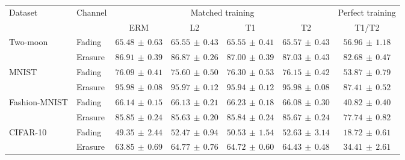 \begin{tabular*}{\linewidth}{@{\extracolsep{\fill}}llccccc@{}}
\toprule
\multirow{2}{*}{Dataset} & \multirow{2}{*}{Channel} & \multicolumn{4}{c}{Matched training} & Perfect training \\
\cmidrule(lr){3-6}\cmidrule(l){7-7}
 & & ERM & L2 & T1 & T2 & T1/T2 \\
\midrule
\multirow{2}{*}{Two-moon} & Fading & $65.48\,\pm\,0.63$ & $65.55\,\pm\,0.43$ & $65.55\,\pm\,0.41$ & $\mathbf{65.57}\,\pm\,0.43$ & $56.96\,\pm\,1.18$ \\
 & Erasure & $86.91\,\pm\,0.39$ & $86.87\,\pm\,0.26$ & $87.00\,\pm\,0.39$ & $\mathbf{87.03}\,\pm\,0.43$ & $82.68\,\pm\,0.47$ \\
\midrule[0.25pt]
\multirow{2}{*}{MNIST} & Fading & $76.09\,\pm\,0.41$ & $75.60\,\pm\,0.50$ & $\mathbf{76.30}\,\pm\,0.53$ & $76.15\,\pm\,0.42$ & $53.87\,\pm\,0.79$ \\
 & Erasure & $95.98\,\pm\,0.08$ & $95.97\,\pm\,0.12$ & $95.94\,\pm\,0.12$ & $\mathbf{95.98}\,\pm\,0.08$ & $87.41\,\pm\,0.52$ \\
\midrule[0.25pt]
\multirow{2}{*}{Fashion-MNIST} & Fading & $66.14\,\pm\,0.15$ & $66.13\,\pm\,0.21$ & $\mathbf{66.23}\,\pm\,0.18$ & $66.08\,\pm\,0.30$ & $40.82\,\pm\,0.40$ \\
 & Erasure & $\mathbf{85.85}\,\pm\,0.24$ & $85.63\,\pm\,0.20$ & $85.84\,\pm\,0.24$ & $85.67\,\pm\,0.24$ & $77.74\,\pm\,0.82$ \\
\midrule[0.25pt]
\multirow{2}{*}{CIFAR-10} & Fading & $49.35\,\pm\,2.44$ & $52.47\,\pm\,0.94$ & $50.53\,\pm\,1.54$ & $\mathbf{52.63}\,\pm\,3.14$ & $18.72\,\pm\,0.61$ \\
 & Erasure & $63.85\,\pm\,0.69$ & $\mathbf{64.77}\,\pm\,0.76$ & $64.72\,\pm\,0.60$ & $64.43\,\pm\,0.48$ & $34.41\,\pm\,2.61$ \\
\bottomrule
\end{tabular*}
